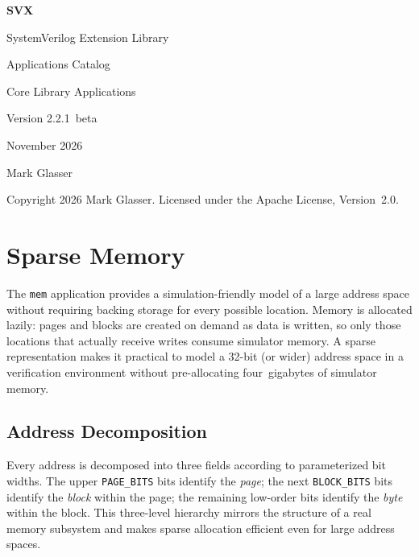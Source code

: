 \documentclass[11pt,letterpaper]{report}
\begin{document}
\begin{titlepage}
  \centering
  \vspace*{2cm}
  {\Huge\bfseries SVX\par}
  \vspace{0.5em}
  {\Large SystemVerilog Extension Library\par}
  \vspace{1.5em}
  {\huge Applications Catalog\par}
  \vspace{0.5em}
  {\large Core Library Applications\par}
  \vspace{2em}
  {\large Version 2.2.1~beta\par}
  \vspace{0.5em}
  {\large November 2026\par}
  \vspace{0.5em}
  {\large Mark Glasser\par}
  \vfill
  {\small Copyright 2026 Mark Glasser.
  Licensed under the Apache License, Version~2.0.\par}
\end{titlepage}

\tableofcontents
\newpage
\chapter{Sparse Memory}


The \texttt{mem} application provides a simulation-friendly model of a large
address space without requiring backing storage for every possible location.
Memory is allocated lazily: pages and blocks are created on demand as data
is written, so only those locations that actually receive writes consume
simulator memory.  A sparse representation makes it practical to model a
32-bit (or wider) address space in a verification environment without
pre-allocating four~gigabytes of simulator memory.

\section*{Address Decomposition}

Every address is decomposed into three fields according to parameterized
bit widths.  The upper \texttt{PAGE\_BITS} bits identify the \emph{page};
the next \texttt{BLOCK\_BITS} bits identify the \emph{block} within the
page; the remaining low-order bits identify the \emph{byte} within the
block.  This three-level hierarchy mirrors the structure of a real memory
subsystem and makes sparse allocation efficient even for large address
spaces.
\end{document}
